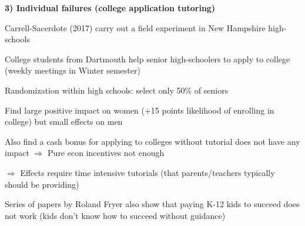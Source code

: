 \documentclass[landscape]{slides}
\begin{document}
\begin{slide}
\begin{center}
{\bf 3) Individual failures (college application tutoring)}
\end{center}

Carrell-Sacerdote (2017) carry out a field experiment in New Hampshire high-schools

College students from Dartmouth help senior high-schoolers to apply to college (weekly meetings
in Winter semester)

Randomization within high schools: select only 50\% of seniors 

Find large positive impact on women (+15 points likelihood of enrolling in college) but small effects 
on men

Also find a cash bonus for applying to colleges without tutorial does not have any impact $\Rightarrow$
Pure econ incentives not enough

$\Rightarrow$ Effects require time intensive tutorials (that parents/teachers typically should be providing)

\small Series of papers by Roland Fryer also show that paying K-12 kids to succeed does not work
(kids don't know how to succeed without guidance)
\end{slide}


%
%
%
%
%
%
%
%
%
%
\end{document}
